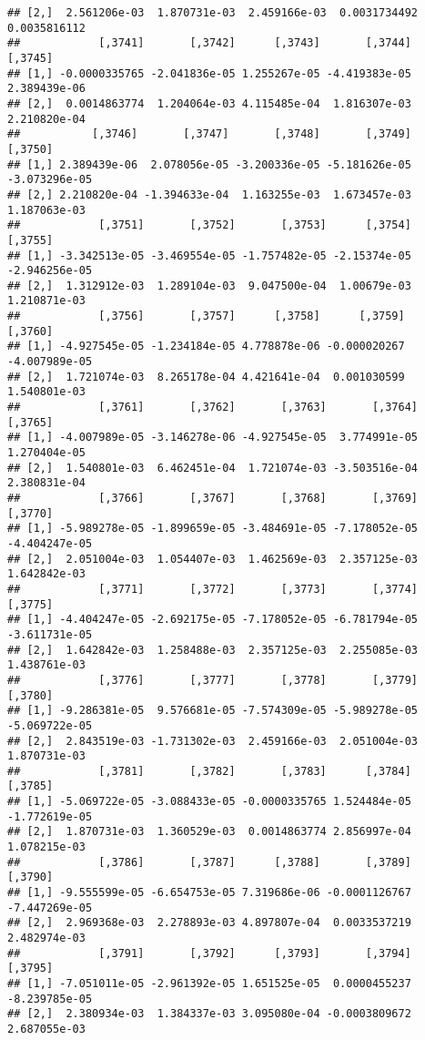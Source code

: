 \documentclass[
]{article}
\begin{document}
\begin{verbatim}
## [2,]  2.561206e-03  1.870731e-03  2.459166e-03  0.0031734492  0.0035816112
##            [,3741]       [,3742]      [,3743]       [,3744]      [,3745]
## [1,] -0.0000335765 -2.041836e-05 1.255267e-05 -4.419383e-05 2.389439e-06
## [2,]  0.0014863774  1.204064e-03 4.115485e-04  1.816307e-03 2.210820e-04
##           [,3746]       [,3747]       [,3748]       [,3749]       [,3750]
## [1,] 2.389439e-06  2.078056e-05 -3.200336e-05 -5.181626e-05 -3.073296e-05
## [2,] 2.210820e-04 -1.394633e-04  1.163255e-03  1.673457e-03  1.187063e-03
##            [,3751]       [,3752]       [,3753]      [,3754]       [,3755]
## [1,] -3.342513e-05 -3.469554e-05 -1.757482e-05 -2.15374e-05 -2.946256e-05
## [2,]  1.312912e-03  1.289104e-03  9.047500e-04  1.00679e-03  1.210871e-03
##            [,3756]       [,3757]      [,3758]      [,3759]       [,3760]
## [1,] -4.927545e-05 -1.234184e-05 4.778878e-06 -0.000020267 -4.007989e-05
## [2,]  1.721074e-03  8.265178e-04 4.421641e-04  0.001030599  1.540801e-03
##            [,3761]       [,3762]       [,3763]       [,3764]      [,3765]
## [1,] -4.007989e-05 -3.146278e-06 -4.927545e-05  3.774991e-05 1.270404e-05
## [2,]  1.540801e-03  6.462451e-04  1.721074e-03 -3.503516e-04 2.380831e-04
##            [,3766]       [,3767]       [,3768]       [,3769]       [,3770]
## [1,] -5.989278e-05 -1.899659e-05 -3.484691e-05 -7.178052e-05 -4.404247e-05
## [2,]  2.051004e-03  1.054407e-03  1.462569e-03  2.357125e-03  1.642842e-03
##            [,3771]       [,3772]       [,3773]       [,3774]       [,3775]
## [1,] -4.404247e-05 -2.692175e-05 -7.178052e-05 -6.781794e-05 -3.611731e-05
## [2,]  1.642842e-03  1.258488e-03  2.357125e-03  2.255085e-03  1.438761e-03
##            [,3776]       [,3777]       [,3778]       [,3779]       [,3780]
## [1,] -9.286381e-05  9.576681e-05 -7.574309e-05 -5.989278e-05 -5.069722e-05
## [2,]  2.843519e-03 -1.731302e-03  2.459166e-03  2.051004e-03  1.870731e-03
##            [,3781]       [,3782]       [,3783]      [,3784]       [,3785]
## [1,] -5.069722e-05 -3.088433e-05 -0.0000335765 1.524484e-05 -1.772619e-05
## [2,]  1.870731e-03  1.360529e-03  0.0014863774 2.856997e-04  1.078215e-03
##            [,3786]       [,3787]      [,3788]       [,3789]       [,3790]
## [1,] -9.555599e-05 -6.654753e-05 7.319686e-06 -0.0001126767 -7.447269e-05
## [2,]  2.969368e-03  2.278893e-03 4.897807e-04  0.0033537219  2.482974e-03
##            [,3791]       [,3792]      [,3793]       [,3794]       [,3795]
## [1,] -7.051011e-05 -2.961392e-05 1.651525e-05  0.0000455237 -8.239785e-05
## [2,]  2.380934e-03  1.384337e-03 3.095080e-04 -0.0003809672  2.687055e-03

\end{verbatim}
\end{document}
